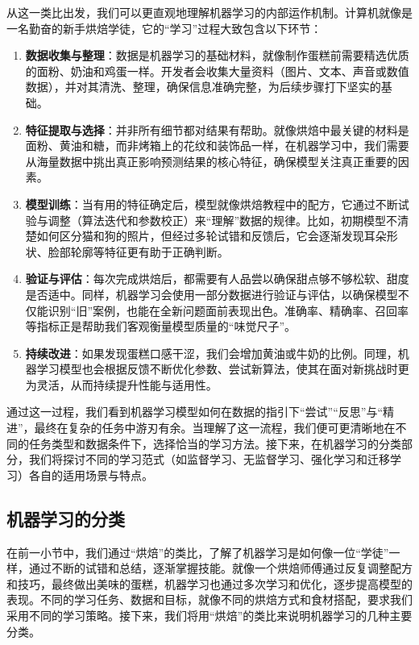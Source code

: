 从这一类比出发，我们可以更直观地理解机器学习的内部运作机制。计算机就像是一名勤奋的新手烘焙学徒，它的“学习”过程大致包含以下环节：
\begin{enumerate}
    \item \textbf{数据收集与整理}：数据是机器学习的基础材料，就像制作蛋糕前需要精选优质的面粉、奶油和鸡蛋一样。开发者会收集大量资料（图片、文本、声音或数值数据），并对其清洗、整理，确保信息准确完整，为后续步骤打下坚实的基础。
    \item \textbf{特征提取与选择}：并非所有细节都对结果有帮助。就像烘焙中最关键的材料是面粉、黄油和糖，而非烤箱上的花纹和装饰品一样，在机器学习中，我们需要从海量数据中挑出真正影响预测结果的核心特征，确保模型关注真正重要的因素。
    \item\textbf{模型训练}：当有用的特征确定后，模型就像烘焙教程中的配方，它通过不断试验与调整（算法迭代和参数校正）来“理解”数据的规律。比如，初期模型不清楚如何区分猫和狗的照片，但经过多轮试错和反馈后，它会逐渐发现耳朵形状、脸部轮廓等特征更有助于正确判断。
    \item \textbf{验证与评估}：每次完成烘焙后，都需要有人品尝以确保甜点够不够松软、甜度是否适中。同样，机器学习会使用一部分数据进行验证与评估，以确保模型不仅能识别“旧”案例，也能在全新问题面前表现出色。准确率、精确率、召回率等指标正是帮助我们客观衡量模型质量的“味觉尺子”。
    \item \textbf{持续改进}：如果发现蛋糕口感干涩，我们会增加黄油或牛奶的比例。同理，机器学习模型也会根据反馈不断优化参数、尝试新算法，使其在面对新挑战时更为灵活，从而持续提升性能与适用性。
\end{enumerate}

通过这一过程，我们看到机器学习模型如何在数据的指引下“尝试”“反思”与“精进”，最终在复杂的任务中游刃有余。当理解了这一流程，我们便可更清晰地在不同的任务类型和数据条件下，选择恰当的学习方法。接下来，在机器学习的分类部分，我们将探讨不同的学习范式（如监督学习、无监督学习、强化学习和迁移学习）各自的适用场景与特点。

\subsection{机器学习的分类}
在前一小节中，我们通过“烘焙”的类比，了解了机器学习是如何像一位“学徒”一样，通过不断的试错和总结，逐渐掌握技能。就像一个烘焙师傅通过反复调整配方和技巧，最终做出美味的蛋糕，机器学习也通过多次学习和优化，逐步提高模型的表现。不同的学习任务、数据和目标，就像不同的烘焙方式和食材搭配，要求我们采用不同的学习策略。接下来，我们将用“烘焙”的类比来说明机器学习的几种主要分类。

